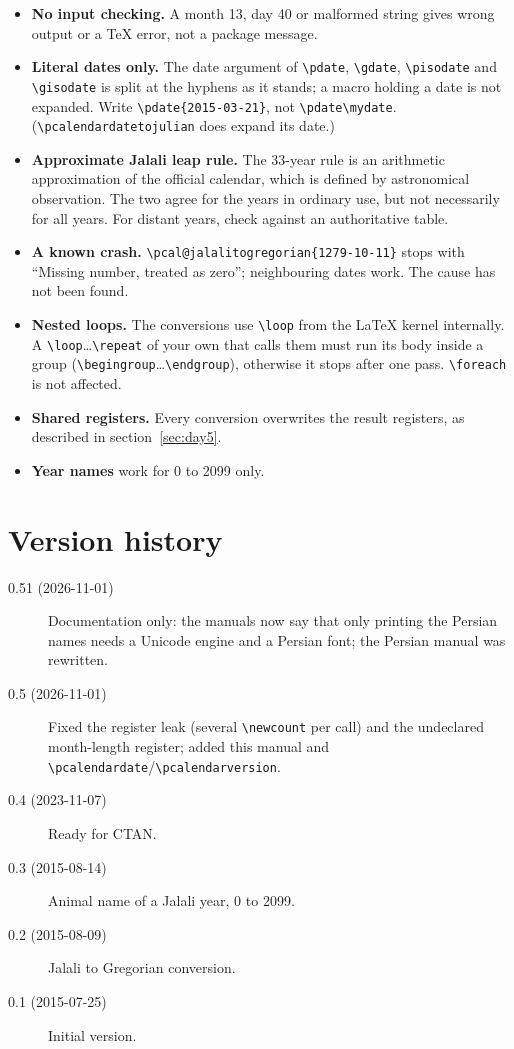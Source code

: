 \documentclass[11pt]{article}
\newcommand\cs[1]{\texttt{\textbackslash #1}}
\begin{document}
\begin{itemize}
  \item \textbf{No input checking.} A month 13, day 40 or malformed string gives wrong output or a TeX
    error, not a package message.
  \item \textbf{Literal dates only.} The date argument of \cs{pdate}, \cs{gdate}, \cs{pisodate} and
    \cs{gisodate} is split at the hyphens as it stands; a macro holding a date is not expanded. Write
    \cs{pdate}\texttt{\{2015-03-21\}}, not \cs{pdate}\cs{mydate}. (\cs{pcalendardatetojulian} does
    expand its date.)
  \item \textbf{Approximate Jalali leap rule.} The 33-year rule is an arithmetic approximation of the
    official calendar, which is defined by astronomical observation. The two agree for the years in
    ordinary use, but not necessarily for all years. For distant years, check against an authoritative
    table.
  \item \textbf{A known crash.} \cs{pcal@jalalitogregorian}\texttt{\{1279-10-11\}} stops with ``Missing
    number, treated as zero''; neighbouring dates work. The cause has not been found.
  \item \textbf{Nested loops.} The conversions use \cs{loop} from the \LaTeX{} kernel internally. A
    \cs{loop}\ldots\cs{repeat} of your own that calls them must run its body inside a group
    (\cs{begingroup}\ldots\cs{endgroup}), otherwise it stops after one pass. \cs{foreach} is not affected.
  \item \textbf{Shared registers.} Every conversion overwrites the result registers, as described in
    section~\ref{sec:day5}.
  \item \textbf{Year names} work for 0 to 2099 only.
\end{itemize}

\section{Version history}\label{sec:version11}

\begin{description}
  \item[0.51 (2026-11-01)] Documentation only: the manuals now say that only printing the Persian names
    needs a Unicode engine and a Persian font; the Persian manual was rewritten.
  \item[0.5 (2026-11-01)] Fixed the register leak (several \cs{newcount} per call) and the undeclared
    month-length register; added this manual and
    \cs{pcalendardate}/\cs{pcalendarversion}.
  \item[0.4 (2023-11-07)] Ready for CTAN.
  \item[0.3 (2015-08-14)] Animal name of a Jalali year, 0 to 2099.
  \item[0.2 (2015-08-09)] Jalali to Gregorian conversion.
  \item[0.1 (2015-07-25)] Initial version.
\end{description}
\end{document}
